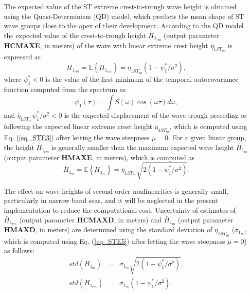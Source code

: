 The expected value of the ST extreme crest-to-trough wave height is obtained using the Quasi-Determinism (QD) model, which predicts the mean shape of ST wave groups close to the apex of their development. According to the QD model the expected value of the crest-to-trough height $\bar{H}_{1_{cm}}$ (output parameter \textbf{HCMAXE}, in meters) of the wave with linear extreme crest height $\bar{\eta}_{1ST_m}$ is expressed as
\begin{equation}
\bar{H}_{1_{cm}}=\mathbb{E}\left\{H_{1_{cm}} \right\} = \bar{\eta}_{1ST_m}(1-\psi_1^* / \sigma^2),
\label{eq_STE6}
\end{equation}
where $\psi_1^* < 0$ is the value of the first minimum of the temporal autocovariance function computed from the spectrum as
\begin{equation}
\psi_1(\tau) = \int S(\omega) \cos{(\omega \tau)} d \omega,
\label{eq_STE7}
\end{equation}
and $\bar{\eta}_{1ST_m}  \psi_1^*/\sigma^2 < 0$ is the expected displacement of the wave trough preceding or following the expected linear extreme crest height $\bar{\eta}_{1ST_m}$, which is computed using Eq. (\ref{eq_STE3}) after letting the wave steepness $\mu=0$. For a given linear group, the height $\bar{H}_{1_{cm}}$ is generally smaller than the maximum expected wave height $\bar{H}_{1_m}$ (output parameter \textbf{HMAXE}, in meters), which is computed as
\begin{equation}
\bar{H}_{1_m}=\mathbb{E}\left\{H_{1_m} \right\} = \bar{\eta}_{1ST_m}\sqrt{2(1-\psi_1^* / \sigma^2)}.
\label{eq_STE8}
\end{equation}

The effect on wave heights of second-order nonlinearities is generally small, particularly in narrow band seas, and it will be neglected in the present implementation to reduce the computational cost. Uncertainty of estimates of $\bar{H}_{1_{cm}}$ (output parameter \textbf{HCMAXD}, in meters) and $\bar{H}_{1_m}$ (output parameter \textbf{HMAXD}, in meters) are determined using the standard deviation of $\eta_{1ST_m}$ ($\sigma_{1_m}$, which is computed using Eq. (\ref{eq_STE5}) after letting the wave steepness $\mu=0$) as follows:
\begin{eqnarray}
std({H}_{1_m})&=&\sigma_{1_m}\sqrt{2(1-\psi_1^* / \sigma^2)}, \nonumber \\
std({H}_{1_{cm}})&=&\sigma_{1_m}(1-\psi_1^* / \sigma^2).
\label{eq_STE9}
\end{eqnarray}

